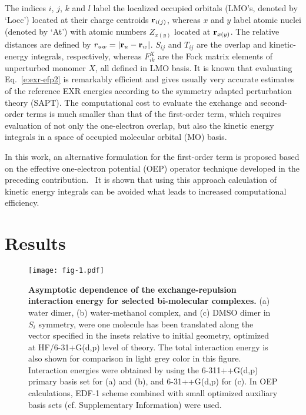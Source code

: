 \documentclass[aip,jcp,amsmath,amssymb,preprint,floatfix]{revtex4-1}
\begin{document}
%
The indices $i$, $j$, $k$ and $l$ label the localized occupied orbitals (LMO's, denoted by `Locc')
located at their charge centroids ${\bf r}_{i(j)}$,
whereas $x$ and $y$ label atomic nuclei (denoted by `At') with atomic numbers 
$Z_{x(y)}$ located at ${\bf r}_{x(y)}$. The relative distances are
defined by $r_{uw}=\vert {\bf r}_u-{\bf r}_w\vert$.
$S_{ij}$ and $T_{ij}$ are the overlap and kinetic\hyp{}energy
integrals, respectively, whereas $F_{ik}^X$ are the Fock matrix elements
of unperturbed monomer $X$, all defined in LMO basis.
It is known that evaluating Eq.~\eqref{e:exr-efp2}
is remarkably efficient and gives usually very accurate
estimates of the reference EXR energies according to the symmetry 
adapted perturbation theory\cite{Jeziorski.Moszynski.Szalewicz.ChemRev.1994} (SAPT).
The computational cost to evaluate
the exchange and second\hyp{}order terms
is much smaller than that of the first\hyp{}order term,
which requires evaluation of not only the one\hyp{}electron overlap,
but also the kinetic
energy integrals in a space of occupied molecular orbital (MO) basis.

In this work, an alternative formulation for the first\hyp{}order
term is proposed based on the effective one\hyp{}electron potential (OEP)
operator technique developed in the preceding contribution.~\cite{Blasiak.Bednarska.Choluj.Bartkowiak.JCP.2019}
It is shown that using this approach calculation of kinetic energy integrals can be avoided
what leads to increased computational efficiency.

\section{Results}

%
\begin{figure}[t]
\texttt{[image: fig-1.pdf]}
\caption{\label{f:fig-1} {\bf Asymptotic dependence of the exchange\hyp{}repulsion interaction energy
for selected bi\hyp{}molecular complexes.} 
(a) water dimer, 
(b) water\hyp{}methanol complex, and 
(c) DMSO dimer in $S_i$ symmetry,
were one molecule has been translated
along the vector specified in the insets relative to initial geometry,
optimized at HF/6-31+G(d,p) level of theory.
The 
total interaction energy
is also shown for comparison in light grey color in this figure.
Interaction energies were obtained by using the 6-311++G(d,p)
primary basis set for (a) and (b), and 6-31++G(d,p) for (c).
In OEP calculations, EDF-1 scheme combined with small optimized auxiliary basis sets
(cf. Supplementary Information) were used.
} 
\end{figure}
%
\end{document}
